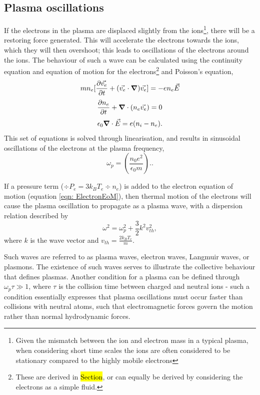 \subsection{Plasma oscillations}
If the electrons in the plasma are displaced slightly from the ions\footnote{Given the mismatch between the ion and electron mass in a typical plasma, when considering short time scales the ions are often considered to be stationary compared to the highly mobile electrons}, there will be a restoring force generated. This will accelerate the electrons towards the ions, which they will then overshoot; this leads to oscillations of the electrons around the ions. The behaviour of such a wave can be calculated using the continuity equation and equation of motion for the electrons\footnote{These are derived in \hl{Section}, or can equally be derived by considering the electrons as a simple fluid.} and Poisson's equation,
\begin{equation} m n_e [\frac{\partial\vec{v_e}}{\partial t} + (\vec{v_e} \cdot \grad)\vec{v_e}] = -e n_e \vec{E} \end{equation}
\begin{equation} \frac{\partial n_e}{\partial t} + \grad \cdot (n_e \vec{v_e}) = 0 \label{eqn: ElectronEoM} \end{equation}
\begin{equation} \epsilon_0 \grad \cdot \vec{E} = e(n_i - n_e). \end{equation}
This set of equations is solved through linearisation, and results in sinusoidal oscillations of the electrons at the plasma frequency, 
\begin{equation} \omega_p = \left( \frac{n_0 e^2}{\epsilon_0 m}\right). \label{eqn: PlasmaFrequency}. \end{equation}

If a pressure term ($\div P_e = 3 k_B T_e \div n_e$) is added to the electron equation of motion (equation \ref{eqn: ElectronEoM}), then thermal motion of the electrons will cause the plasma oscillation to propagate as a plasma wave, with a dispersion relation described by
\begin{equation} \omega^2 = \omega_p^2 + \frac{3}{2} k^2 v_{th}^2, \end{equation}
where $k$ is the wave vector and $v_{th} = \frac{2 k_B T_e}{m}$. 

Such waves are referred to as plasma waves, electron waves, Langmuir waves, or plasmons. The existence of such waves serves to illustrate the collective behaviour that defines plasmas. Another condition for a plasma can be defined through $\omega_p \tau \gg 1$, where $\tau$ is the collision time between charged and neutral ions - such a condition essentially expresses that plasma oscillations must occur faster than collisions with neutral atoms, such that electromagnetic forces govern the motion rather than normal hydrodynamic forces.

